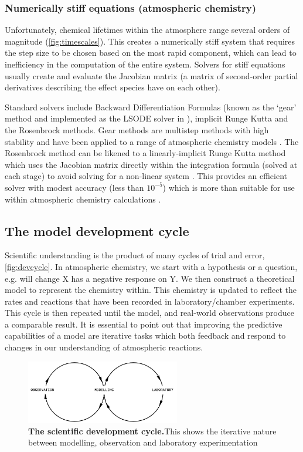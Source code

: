\subsubsection{Numerically stiff equations (atmospheric chemistry)}
Unfortunately, chemical lifetimes within the atmosphere range several orders of magnitude (\autoref{fig:timescales}). This creates a numerically stiff system that requires the step size to be chosen based on the most rapid component, which can lead to inefficiency in the computation of the entire system. Solvers for stiff equations usually create and evaluate the Jacobian matrix (a matrix of second-order partial derivatives describing the effect species have on each other). 

Standard solvers include Backward Differentiation Formulas (known as the `gear' method and implemented as the LSODE solver in \citep{kpp}),  implicit Runge Kutta and the Rosenbrock methods. Gear methods are multistep methods with high stability and have been applied to a range of atmospheric chemistry models \citep{gear, geos, fundamentals}. 
The Rosenbrock method can be likened to a linearly-implicit Runge Kutta method which uses the Jacobian matrix directly within the integration formula (solved at each stage) to avoid solving for a non-linear system \citep{solvers}. This provides an efficient solver with modest accuracy (less than $10^{-5}$) which is more than suitable for use within atmospheric chemistry calculations \citep{solvers,rosenbrock}. 


\subsection{The model development cycle}
Scientific understanding is the product of many cycles of trial and error, \autoref{fig:devcycle}. In atmospheric chemistry, we start with a hypothesis or a question, e.g. will change X has a negative response on Y. We then construct a theoretical model to represent the chemistry within. This chemistry is updated to reflect the rates and reactions that have been recorded in laboratory/chamber experiments. This cycle is then repeated until the model, and real-world observations produce a comparable result.
It is essential to point out that improving the predictive capabilities of a model are iterative tasks which both feedback and respond to changes in our understanding of atmospheric reactions. 



\begin{figure}[H]
    \centering
    \includegraphics[width=0.6\textwidth]{devcycle.png}
    \caption{\textbf{The scientific development cycle.}This shows the iterative nature between modelling, observation and laboratory experimentation}
    \label{fig:devcycle}
\end{figure}

